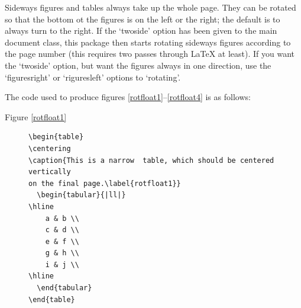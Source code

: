 \documentclass[twoside]{report}
\begin{document}
Sideways figures and tables always take up the whole page. They can be
rotated so that the bottom ot the figures is on the left or the right;
the default is to always turn to the right. If the `twoside' option
has been given to the main document class, this package then starts
rotating sideways figures according to the page number (this requires
two passes through \LaTeX{} at least). If you want the `twoside'
option, but want the figures always in one direction, use the
`figuresright' or `riguresleft' options to `rotating'.

The code used to produce figures
\ref{rotfloat1}--\ref{rotfloat4} is as follows:
\begin{description}

\item[Figure \ref{rotfloat1}]
{\small\begin{verbatim}
\begin{table}
\centering
\caption{This is a narrow  table, which should be centered vertically
on the final page.\label{rotfloat1}}
  \begin{tabular}{|ll|}
\hline
    a & b \\
    c & d \\
    e & f \\
    g & h \\
    i & j \\
\hline
  \end{tabular}
\end{table}
\end{verbatim}
}


\end{description}
\end{document}
